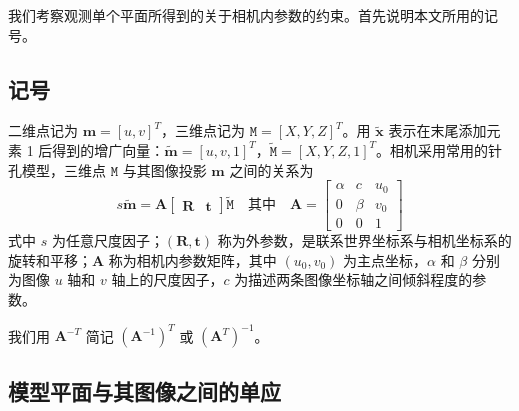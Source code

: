 \documentclass[a4paper,twocolumn,zihao=5,fontset=none,UTF8]{ctexart}
\newcommand{\A}{\mathbf{A}}
\newcommand{\R}{\mathbf{R}}
\newcommand{\tv}{\mathbf{t}}
\newcommand{\m}{\mathbf{m}}
\newcommand{\tm}{\widetilde{\mathbf{m}}}
\newcommand{\M}{\mathtt{M}}
\newcommand{\tM}{\widetilde{\mathtt{M}}}
\begin{document}
我们考察观测单个平面所得到的关于相机内参数的约束。首先说明本文所用的记号。

\subsection{记号}

二维点记为 $\m=[u,v]^T$，三维点记为 $\M=[X,Y,Z]^T$。用 $\widetilde{\mathbf{x}}$ 表示在末尾添加元素 1 后得到的增广向量：$\tm=[u,v,1]^T$，$\tM=[X,Y,Z,1]^T$。相机采用常用的针孔模型，三维点 $\M$ 与其图像投影 $\m$ 之间的关系为
\begin{equation}
  s\tm=\A\begin{bmatrix}\R & \tv\end{bmatrix}\tM
  \quad\text{其中}\quad
  \A=\begin{bmatrix}\alpha & c & u_0\\ 0 & \beta & v_0\\ 0 & 0 & 1\end{bmatrix}
\end{equation}
式中 $s$ 为任意尺度因子；$(\R,\tv)$ 称为外参数，是联系世界坐标系与相机坐标系的旋转和平移；$\A$ 称为相机内参数矩阵，其中 $(u_0,v_0)$ 为主点坐标，$\alpha$ 和 $\beta$ 分别为图像 $u$ 轴和 $v$ 轴上的尺度因子，$c$ 为描述两条图像坐标轴之间倾斜程度的参数。

我们用 $\A^{-T}$ 简记 $(\A^{-1})^T$ 或 $(\A^T)^{-1}$。

\subsection{模型平面与其图像之间的单应}
\end{document}
